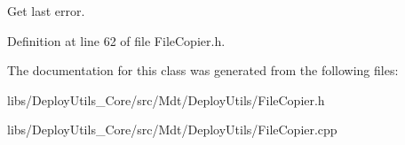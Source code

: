 Get last error. 



Definition at line 62 of file File\+Copier.\+h.



The documentation for this class was generated from the following files\+:\begin{DoxyCompactItemize}
\item 
libs/\+Deploy\+Utils\+\_\+\+Core/src/\+Mdt/\+Deploy\+Utils/File\+Copier.\+h\item 
libs/\+Deploy\+Utils\+\_\+\+Core/src/\+Mdt/\+Deploy\+Utils/File\+Copier.\+cpp\end{DoxyCompactItemize}
